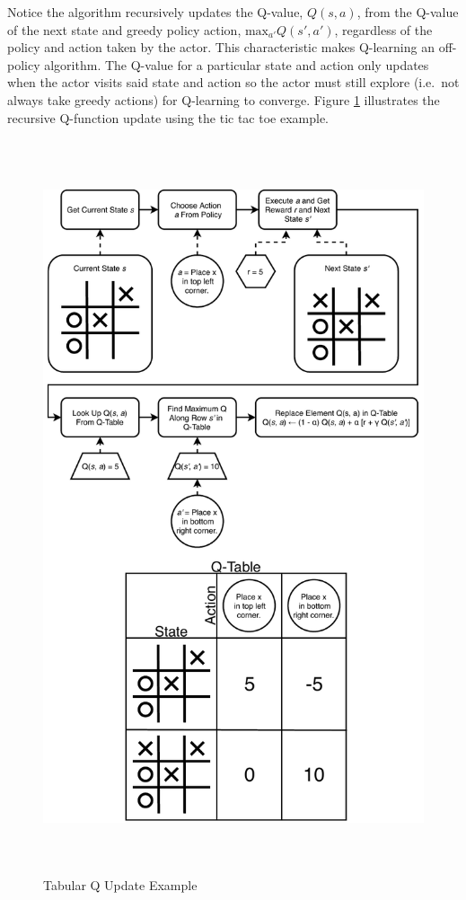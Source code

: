 Notice the algorithm recursively updates the Q-value, $Q(s,a)$, from the Q-value of the next state and greedy policy action, $\text{max}_{a'}Q(s',a')$, regardless of the policy and action taken by the actor. This characteristic makes Q-learning an off-policy algorithm. The Q-value for a particular state and action only updates when the actor visits said state and action so the actor must still explore (i.e.\ not always take greedy actions) for Q-learning to converge. Figure \ref{fig:q_learning_ex} illustrates the recursive Q-function update using the tic tac toe example. 
\begin{figure}   %
	\centering \includegraphics[width=6in, height=8.5in, keepaspectratio]{figures/q_learning_ex.pdf}
	\caption{Tabular Q Update Example}\label{fig:q_learning_ex}
\end{figure}

